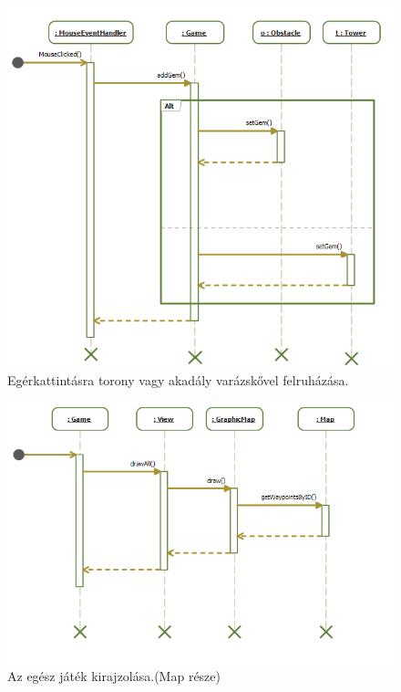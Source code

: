 \begin{figure}[H]
\begin{center}
\includegraphics[width=18cm]{images/grafikaSeq/mouseEnch.png}
\caption{Egérkattintásra torony vagy akadály varázskővel felruházása.}
\label{fig:Graphic_mouse_enchant}
\end{center}
\end{figure}

\begin{figure}[H]
\begin{center}
\includegraphics[width=18cm]{images/grafikaSeq/step1.png}
\caption{Az egész játék kirajzolása.(Map része)}
\label{fig:Graphic_drawAll_Map}
\end{center}
\end{figure}

